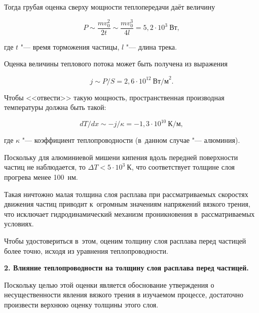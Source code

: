Тогда грубая оценка сверху мощности теплопередачи даёт величину

\begin{equation}\label{eq:math:ex1}

    P\sim \frac{mv_{0}^{2}}{2t}\sim \frac{mv_{0}^{3}}{4l}=5,2\cdot10^{3}~\mbox{Вт},

\end{equation}

где $t $ "--- время торможения частицы, $l $ "--- длина трека. 

Оценка величины теплового потока может быть получена из выражения

\begin{equation}\label{eq:math:ex2}

    j\sim{P}/{S}= 2,6\cdot10^{12}~\mbox{Вт/м}^{2}.

\end{equation}

Чтобы <<отвести>> такую мощность, пространственная производная температуры должна быть такой:

\begin{equation}\label{eq:math:ex3}

    {dT}/{dx}\sim -{j}/{\kappa}=-1,3\cdot10^{10}~\mbox{К/м},

\end{equation}

где $\kappa $ "--- коэффициент теплопроводности (в~данном случае "--- алюминия).

Поскольку для алюминиевой мишени кипения вдоль передней поверхности частиц не наблюдается, то $\Delta T<5\cdot10^{3}~\mbox{К} $, что соответствует толщине слоя прогрева менее 100~нм. 

Такая ничтожно малая толщина слоя расплава при рассматриваемых скоростях движения частиц приводит к~огромным значениям напряжений вязкого трения, что исключает гидродинамический механизм проникновения в~рассматриваемых условиях. 

Чтобы удостовериться в~этом, оценим толщину слоя расплава перед частицей более точно, исходя из уравнения теплопроводности.



\smallskip



\textbf{2. Влияние теплопроводности на толщину слоя расплава перед частицей.}

Поскольку целью этой оценки является обоснование утверждения о несущественности явления вязкого трения в изучаемом процессе, достаточно произвести верхнюю оценку толщины этого слоя. 

